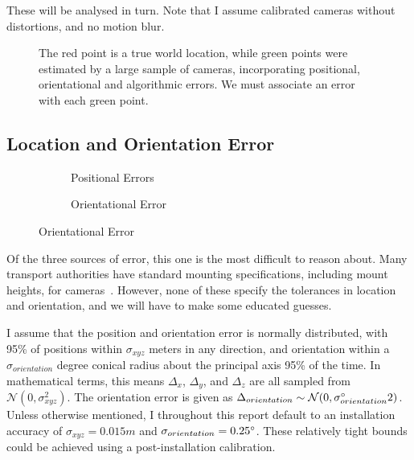 \documentclass[a4paper,12pt,twoside,openright]{report}
\begin{document}
These will be analysed in turn. Note that I assume calibrated cameras without distortions, and no motion blur.


\begin{figure}[htb]
    \begin{center}
        
    \end{center}
    \caption[Example Predictions about a World Point]{The red point is a true world location, while green points were
    estimated by a large sample of cameras, incorporating positional, orientational and algorithmic errors. We must associate an error with each green point.}
    \label{fig:camera:dist}
\end{figure}



\subsection{Location and Orientation Error}
\begin{figure}[htb]
\centering
\begin{subfigure}[b]{.45\textwidth}
  \centering
  \resizebox{\linewidth}{!}{} 
  \caption{Positional Errors}
  \label{fig:camera:xyz error}
\end{subfigure}%
\begin{subfigure}[b]{.45\textwidth}
  \centering
  \resizebox{\linewidth}{!}{}
  \caption{Orientational Error}
  \label{fig:camera:orient error}
\end{subfigure}
\label{fig:camera:errors}
\end{figure}

Of the three sources of error, this one is the most difficult to reason about. 
Many transport authorities have standard mounting specifications, including mount heights, for cameras~\cite{StreetscapeGuideance}.
However, none of these specify the tolerances in location and orientation, and we will have to make some educated guesses.

I assume that the position and orientation error is normally distributed, with
95\% of positions within $\sigma_{xyz}$ meters in any direction, 
and orientation within a $\sigma_{orientation}$ degree conical radius about the principal axis 95\% of the time.
In mathematical terms, this means $\Delta_{x}$, $\Delta_{y}$, and $\Delta_{z}$ 
are all sampled from $\mathcal{N}(0, \sigma_{xyz}^2)$. The orientation error is given as
$\Delta_{orientation} \sim \mathcal{N}(0, \sigma_{orientation}\degree2)$.
Unless otherwise mentioned, I throughout this report default to an installation accuracy of
$\sigma_{xyz} = 0.015m$ and $\sigma_{orientation} = 0.25\degree$. These relatively
tight bounds could be achieved using a post-installation calibration.
\end{document}
